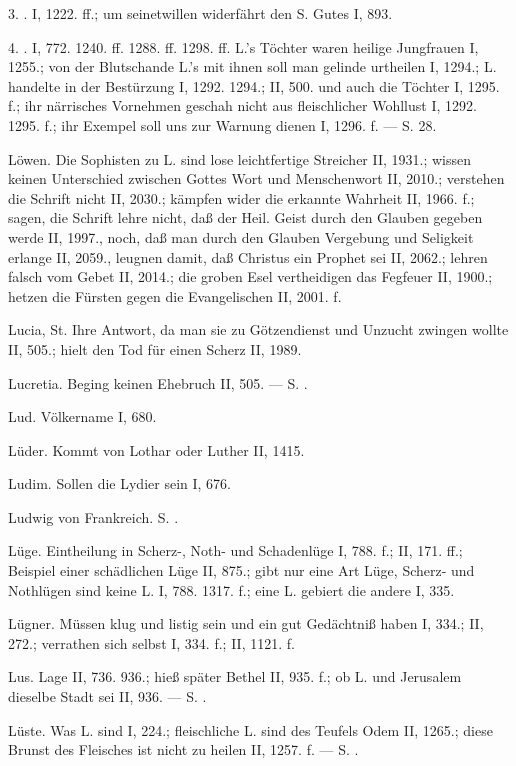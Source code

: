 3. . I, 1222. ff.; um seinetwillen widerfährt den S. Gutes I, 893.

4. . I, 772. 1240. ff. 1288. ff. 1298. ff. L.’s Töchter waren heilige Jungfrauen I, 1255.; von der Blutschande L.’s mit ihnen soll man gelinde urtheilen I, 1294.; L. handelte in der Bestürzung I, 1292. 1294.; II, 500. und auch die Töchter I, 1295. f.; ihr närrisches Vornehmen geschah nicht aus fleischlicher Wohllust I, 1292. 1295. f.; ihr Exempel soll uns zur Warnung dienen I, 1296. f. — S.  28.

Löwen. Die Sophisten zu L. sind lose leichtfertige Streicher II, 1931.; wissen keinen Unterschied zwischen Gottes Wort und Menschenwort II, 2010.; verstehen die Schrift nicht II, 2030.; kämpfen wider die erkannte Wahrheit II, 1966. f.; sagen, die Schrift lehre nicht, daß der Heil. Geist durch den Glauben gegeben werde II, 1997., noch, daß man durch den Glauben Vergebung und Seligkeit erlange II, 2059., leugnen damit, daß Christus ein Prophet sei II, 2062.; lehren falsch vom Gebet II, 2014.; die groben Esel vertheidigen das Fegfeuer II, 1900.; hetzen die Fürsten gegen die Evangelischen II, 2001. f.

Lucia, St. Ihre Antwort, da man sie zu Götzendienst und Unzucht zwingen wollte II, 505.; hielt den Tod für einen Scherz II, 1989.

Lucretia. Beging keinen Ehebruch II, 505. — S. .

Lud. Völkername I, 680.

Lüder. Kommt von Lothar oder Luther II, 1415.

Ludim. Sollen die Lydier sein I, 676.

Ludwig von Frankreich. S. .

Lüge. Eintheilung in Scherz-, Noth- und Schadenlüge I, 788. f.; II, 171. ff.; Beispiel einer schädlichen Lüge II, 875.; gibt nur eine Art Lüge, Scherz- und Nothlügen sind keine L. I, 788. 1317. f.; eine L. gebiert die andere I, 335.

Lügner. Müssen klug und listig sein und ein gut Gedächtniß haben I, 334.; II, 272.; verrathen sich selbst I, 334. f.; II, 1121. f.

Lus. Lage II, 736. 936.; hieß später Bethel II, 935. f.; ob L. und Jerusalem dieselbe Stadt sei II, 936. — S. .

Lüste. Was L.  sind I, 224.; fleischliche L. sind des Teufels Odem II, 1265.; diese Brunst des Fleisches ist nicht zu heilen II, 1257. f. — S. .

